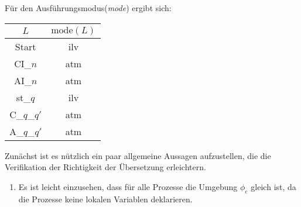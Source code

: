 Für den Ausführungsmodus(\emph{mode}) ergibt sich:

\begin{tabular}{|c|c|}
  \hline
  $L$ & $\textrm{mode}(L)$\\
  \hline
  Start & ilv\\
  CI\_$n$ & atm\\
  AI\_$n$ & atm\\
  st\_$q$ & ilv\\
  C\_$q$\_$q'$ & atm\\
  A\_$q$\_$q'$ & atm\\
  \hline
\end{tabular}

Zunächst ist es nützlich ein paar allgemeine Aussagen aufzustellen, die die Verifikation der Richtigkeit der Übersetzung erleichtern.
\begin{enumerate}
\item Es ist leicht einzusehen, dass für alle Prozesse die Umgebung $\phi_e$ gleich ist, da die Prozesse keine lokalen Variablen deklarieren.
\end{enumerate}

